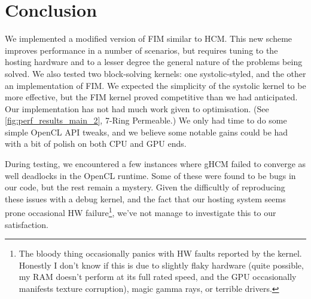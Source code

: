 \documentclass[11pt]{article}       %
\begin{document}

\section{Conclusion} \label{sec:conclusion}

We implemented a modified version of FIM similar to HCM. This new scheme improves performance in a number of scenarios, but requires tuning to the hosting hardware and to a lesser degree the general nature of the problems being solved. We also tested two block-solving kernels: one systolic-styled, and the other an implementation of FIM. We expected the simplicity of the systolic kernel to be more effective, but the FIM kernel proved competitive than we had anticipated. Our implementation has not had much work given to optimisation. (See \autoref{fig:perf_results_main_2}, 7-Ring Permeable.) We only had time to do some simple OpenCL API tweaks, and we believe some notable gains could be had with a bit of polish on both CPU and GPU ends.

During testing, we encountered a few instances where gHCM failed to converge as well deadlocks in the OpenCL runtime. Some of these were found to be bugs in our code, but the rest remain a mystery. Given the difficultly of reproducing these issues with a debug kernel, and the fact that our hosting system seems prone occasional HW failure\footnote{The bloody thing occasionally panics with HW faults reported by the kernel. Honestly I don't know if this is due to slightly flaky hardware (quite possible, my RAM doesn't perform at its full rated speed, and the GPU occasionally manifests texture corruption), magic gamma rays, or terrible drivers.}, we've not manage to investigate this to our satisfaction.
\end{document}

